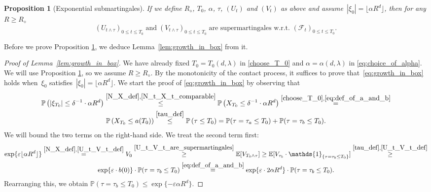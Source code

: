\documentclass[a4paper,12pt]{article}
\newtheorem  {proposition}   [theorem]{Proposition}
\begin{document}
\begin{proposition}[Exponential submartingales] \label{prop:supermartingales}
 If we define $R_\diamond$, $T_0$, $\alpha$, $\tau$, $(U_t)$ and $(V_t)$ as above and
assume~$|\xi_0| = \lfloor \alpha R^d \rfloor$, then for any $R \geq R_\diamond$
 \begin{equation}\label{U_t_V_t_are_supermartingales}
 (U_{t \wedge \tau})_{0 \leq t \leq {T_0}}\; \text{and}\; (V_{t \wedge \tau})_{0 \leq t \leq {T_0}} \;  \text{are supermartingales w.r.t. }(\mathscr{F}_t)_{ 0 \leq t \leq {T_0}}.
 \end{equation}
 \end{proposition}
Before we prove Proposition \ref{prop:supermartingales}, we deduce Lemma~\ref{lem:growth_in_box} from it.


\begin{proof}[Proof of Lemma~\ref{lem:growth_in_box}] We have already fixed $T_0=T_0(d,\lambda)$ in \eqref{choose_T_0} and $\alpha=\alpha(d,\lambda)$ in \eqref{eq:choice_of_alpha}.  We will use Proposition \ref{prop:supermartingales}, so we assume $R \geq R_\diamond$.
 By the monotonicity of the contact process, it suffices to prove that~\eqref{eq:growth_in_box} holds when~$\xi_0$ satisfies~$|\xi_0|= \lfloor \alpha R^d \rfloor$.
   We start the proof of \eqref{eq:growth_in_box} by observing that
  \begin{multline}
  \mathbb{P}\left(|\xi_{T_0}| \leq \delta^{-1} \cdot \alpha  R^d \right) \stackrel{ \eqref{N_X_def}, \eqref{N_t_X_t_comparable} }{\leq}
  \mathbb{P}\left(X_{T_0} \leq \delta^{-1} \cdot \alpha  R^d\right) \stackrel{ \eqref{choose_T_0}, \eqref{eq:def_of_a_and_b} }{=} \\
  \mathbb{P}\left(X_{T_0} \leq a(T_0) \right)
   \stackrel{ \eqref{tau_def} }{\leq}   \mathbb{P}\left( \tau \leq T_0 \right)
  =  \mathbb{P}(\tau = \tau_a \le {T_0}) + \mathbb{P}(\tau = \tau_b \le {T_0}).
  \end{multline}
 We will bound the two terms on the right-hand side.
   We treat the second term first:
\begin{multline}\label{splitting_a_b_prob}
\exp\{\varepsilon \lfloor \alpha R^d\rfloor\} \stackrel{ \eqref{N_X_def}, \eqref{U_t_V_t_def} }{=}
 V_0  \stackrel{\eqref{U_t_V_t_are_supermartingales} }{\geq} \mathbb{E}[V_{{T_0} \wedge \tau}]  \geq \mathbb{E}[V_{\tau_b} \cdot \mathds{1}_{\{\tau = \tau_b \le {T_0} \}}]
 \stackrel{ \eqref{tau_def}, \eqref{U_t_V_t_def} }{\geq} \\
  \exp\{\varepsilon \cdot b(0)\} \cdot \mathbb{P}(\tau = \tau_b \le {T_0})
  \stackrel{ \eqref{eq:def_of_a_and_b} }{=}  \exp\{\varepsilon \cdot 2\alpha R^d \} \cdot \mathbb{P}(\tau = \tau_b \le {T_0}).
\end{multline}
 Rearranging this,
we obtain $\mathbb{P}(\tau = \tau_b \le {T_0}) \leq \exp\{- \varepsilon \alpha R^d \}.$


\end{proof}
\end{document}
